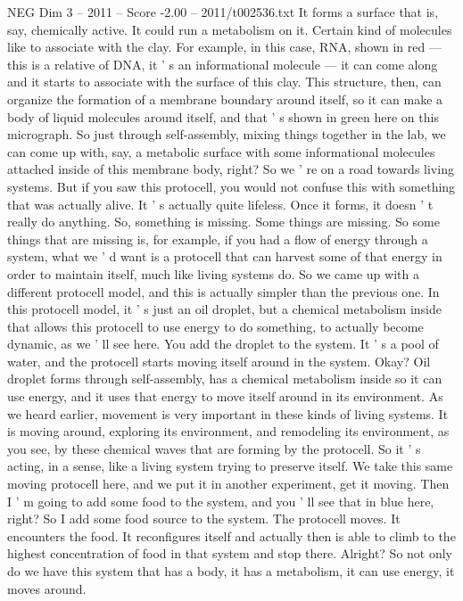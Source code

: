 \begin{textsample}{NEG Dim 3 – 2011 – Score -2.00 – 2011/t002536.txt}
It forms a surface that is, say, chemically active.
It could run a metabolism on it.
Certain kind of molecules like to associate with the clay.
For example, in this case, RNA, shown in red — this is a relative of DNA, it ' s an informational molecule — it can come along and it starts to associate with the surface of this clay.
This structure, then, can organize the formation of a membrane boundary around itself, so it can make a body of liquid molecules around itself, and that ' s shown in green here on this micrograph.
So just through self-assembly, mixing things together in the lab, we can come up with, say, a metabolic surface with some informational molecules attached inside of this membrane body, right?
So we ' re on a road towards living systems.
But if you saw this protocell, you would not confuse this with something that was actually alive.
It ' s actually quite lifeless.
Once it forms, it doesn ' t really do anything.
So, something is missing.
Some things are missing.
So some things that are missing is, for example, if you had a flow of energy through a system, what we ' d want is a protocell that can harvest some of that energy in order to maintain itself, much like living systems do.
So we came up with a different protocell model, and this is actually simpler than the previous one.
In this protocell model, it ' s just an oil droplet, but a chemical metabolism inside that allows this protocell to use energy to do something, to actually become dynamic, as we ' ll see here.
You add the droplet to the system.
It ' s a pool of water, and the protocell starts moving itself around in the system.
Okay?
Oil droplet forms through self-assembly, has a chemical metabolism inside so it can use energy, and it uses that energy to move itself around in its environment.
As we heard earlier, movement is very important in these kinds of living systems.
It is moving around, exploring its environment, and remodeling its environment, as you see, by these chemical waves that are forming by the protocell.
So it ' s acting, in a sense, like a living system trying to preserve itself.
We take this same moving protocell here, and we put it in another experiment, get it moving.
Then I ' m going to add some food to the system, and you ' ll see that in blue here, right?
So I add some food source to the system.
The protocell moves.
It encounters the food.
It reconfigures itself and actually then is able to climb to the highest concentration of food in that system and stop there.
Alright?
So not only do we have this system that has a body, it has a metabolism, it can use energy, it moves around.

\end{textsample}
